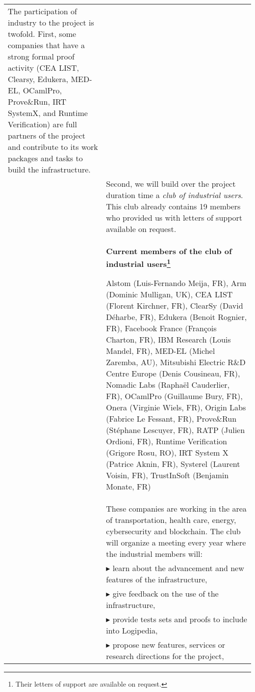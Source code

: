 \begin{longtable}{|p{}|p{}|}
The participation of industry to the project is twofold. First,
some companies that have a strong formal proof activity (CEA
LIST, Clearsy, Edukera, MED-EL, OCamlPro, Prove\&Run, IRT SystemX,
and Runtime Verification) are full partners of the project and
contribute to its work packages and tasks to build the
infrastructure.
\\
&
\hspace{0.4cm}
Second, we will build over the project duration time a {\em club of
  industrial users}. This club already contains
19 members who provided us with letters of support available on request.
\\
&
\hspace{0.4cm}
\definecolor{shadecolor}{named}{color1}
\begin{shaded}
\begin{center}
  {\bf\large Current members of the club of industrial users\footnote{Their letters of support are available on request.}}
\end{center}
Alstom (Luis-Fernando Meija, FR),
Arm (Dominic Mulligan, UK),
CEA LIST (Florent Kirchner, FR),
ClearSy (David Déharbe, FR),
Edukera (Benoit Rognier, FR),
Facebook France (François Charton, FR),
IBM Research (Louis Mandel, FR),
MED-EL (Michel Zaremba, AU),
Mitsubishi Electric R\&D Centre Europe (Denis Cousineau, FR),
Nomadic Labs (Raphaël Cauderlier, FR),
OCamlPro (Guillaume Bury, FR),
Onera (Virginie Wiels, FR),
Origin Labs (Fabrice Le Fessant, FR),
Prove\&Run (Stéphane Lescuyer, FR),
RATP (Julien Ordioni, FR),
Runtime Verification (Grigore Rosu, RO),
IRT System X (Patrice Aknin, FR),
Systerel (Laurent Voisin, FR),
TrustInSoft (Benjamin Monate, FR)
\end{shaded}\\
&
\hspace{0.4cm}
These companies are working in the area of transportation, health
care, energy, cybersecurity and blockchain.
The club will organize a meeting every year where the
industrial members will:\\
&
$\blacktriangleright$
learn about the advancement and new features of the infrastructure,\\
&
$\blacktriangleright$
give feedback on the use of the infrastructure,
\\
&
$\blacktriangleright$ provide tests sets and proofs to include into Logipedia,
\\
&
$\blacktriangleright$ propose new features, services or research directions for the project,
\\

\end{longtable}

